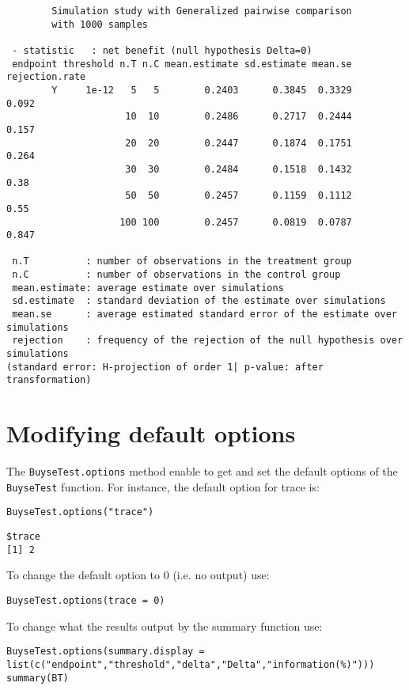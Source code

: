 \documentclass[12pt]{article}
\begin{document}
\begin{verbatim}
        Simulation study with Generalized pairwise comparison
        with 1000 samples

 - statistic   : net benefit (null hypothesis Delta=0)
 endpoint threshold n.T n.C mean.estimate sd.estimate mean.se rejection.rate
        Y     1e-12   5   5        0.2403      0.3845  0.3329          0.092
                     10  10        0.2486      0.2717  0.2444          0.157
                     20  20        0.2447      0.1874  0.1751          0.264
                     30  30        0.2484      0.1518  0.1432           0.38
                     50  50        0.2457      0.1159  0.1112           0.55
                    100 100        0.2457      0.0819  0.0787          0.847

 n.T          : number of observations in the treatment group
 n.C          : number of observations in the control group
 mean.estimate: average estimate over simulations
 sd.estimate  : standard deviation of the estimate over simulations
 mean.se      : average estimated standard error of the estimate over simulations
 rejection    : frequency of the rejection of the null hypothesis over simulations
(standard error: H-projection of order 1| p-value: after transformation)
\end{verbatim}

\clearpage

\section{Modifying default options}
\label{sec:orga62e69c}
The \texttt{BuyseTest.options} method enable to get and set the default
options of the \texttt{BuyseTest} function. For instance, the default option
for trace is:
\lstset{language=r,label= ,caption= ,captionpos=b,numbers=none}
\begin{lstlisting}
BuyseTest.options("trace")
\end{lstlisting}

\begin{verbatim}
$trace
[1] 2
\end{verbatim}

To change the default option to 0 (i.e. no output) use:
\lstset{language=r,label= ,caption= ,captionpos=b,numbers=none}
\begin{lstlisting}
BuyseTest.options(trace = 0)
\end{lstlisting}

To change what the results output by the summary function use:
\lstset{language=r,label= ,caption= ,captionpos=b,numbers=none}
\begin{lstlisting}
BuyseTest.options(summary.display = list(c("endpoint","threshold","delta","Delta","information(%)")))
summary(BT)
\end{lstlisting}
\end{document}
